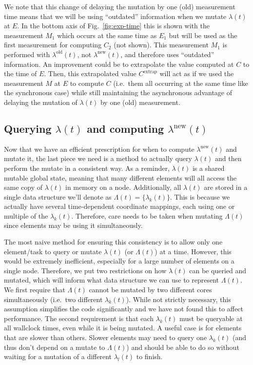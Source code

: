 \begin{bibunit}[unsrtnat]
We note that this change of delaying the mutation by one (old)
measurement time means that we will be using ``outdated'' information when we
mutate $\lambda(t)$ at $E$. In the bottom axis of Fig.~\ref{fig:exp-time} this
is shown with the measurement $M_1$ which occurs at the same time as $E_1$ but
will be used as the first measurement for computing $C_2$ (not shown). This
measurement $M_1$ is performed with $\lambda^\mathrm{old}(t)$, not
$\lambda^\mathrm{new}(t)$, and therefore uses ``outdated'' information. An
improvement could be to extrapolate the value computed at $C$ to the time of
$E$. Then, this extrapolated value $C^\mathrm{extrap}$ will act as if we used
the measurement $M$ at $E$ to compute $C$ (i.e.~them all occurring at the same
time like the synchronous case) while still maintaining the asynchronous
advantage of delaying the mutation of $\lambda(t)$ by one (old) measurement.

\subsection{Querying \texorpdfstring{$\lambda(t)$}{lambda(t)} and computing \texorpdfstring{$\lambda^\mathrm{new}(t)$}{lambda-new(t)}\label{sec:async-update-lambda}}

Now that we have an efficient prescription for when to compute
$\lambda^\mathrm{new}(t)$ and mutate it, the last piece we need is a method to
actually query $\lambda(t)$ and then perform the mutate in a consistent way. As
a reminder, $\lambda(t)$ is a shared mutable global state, meaning that many
different elements will all access the same copy of $\lambda(t)$ in memory on a
node. Additionally, all $\lambda(t)$ are stored in a single data structure we'll
denote as $\Lambda(t) = \{ \lambda_k(t) \}$. This is because we actually have
several time-dependent coordinate mappings, each using one or multiple of the
$\lambda_k(t)$. Therefore, care needs to be taken when mutating $\Lambda(t)$
since elements may be using it simultaneously.

The most naive method for ensuring this consistency is to allow only one
element/task to query or mutate $\lambda(t)$ (or $\Lambda(t)$) at a time.
However, this would be extremely inefficient, especially for a large number of
elements on a single node. Therefore, we put two restrictions on how
$\lambda(t)$ can be queried and mutated, which will inform what data structure
we can use to represent $\Lambda(t)$. We first require that $\Lambda(t)$ cannot
be mutated by two different cores simultaneously (i.e.~two different
$\lambda_k(t)$). While not strictly necessary, this assumption simplifies the
code significantly and we have not found this to affect performance. The second
requirement is that each $\lambda_k(t)$ must be queryable at all wallclock
times, even while it is being mutated. A useful case is for elements that are
slower than others. Slower elements may need to query one $\lambda_k(t)$ (and
thus don't depend on a mutate to $\Lambda(t)$) and should be able to do so
without waiting for a mutation of a different $\lambda_l(t)$ to finish.


\end{bibunit}
